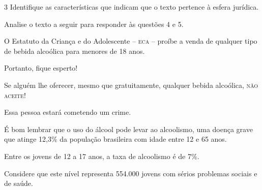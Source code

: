 \num{3} Identifique as características que indicam que o texto pertence à 
esfera jurídica.




Analise o texto a seguir para responder às questões 4 e 5. 


\begin{myquote}

O Estatuto da Criança e do Adolescente -- \textsc{eca} -- proíbe a venda de
qualquer tipo de bebida alcoólica para menores de 18 anos.

Portanto, fique esperto!

Se alguém lhe oferecer, mesmo que gratuitamente, qualquer bebida
alcoólica, \textsc{não aceite}!

Essa pessoa estará cometendo um crime.

É bom lembrar que o uso do álcool pode levar ao alcoolismo, uma doença
grave que atinge 12,3\% da população brasileira com idade entre 12 e 65
anos.

Entre os jovens de 12 a 17 anos, a taxa de alcoolismo é de 7\%.

Considere que este nível representa 554.000 jovens com sérios problemas
sociais e de saúde.


\end{myquote}

